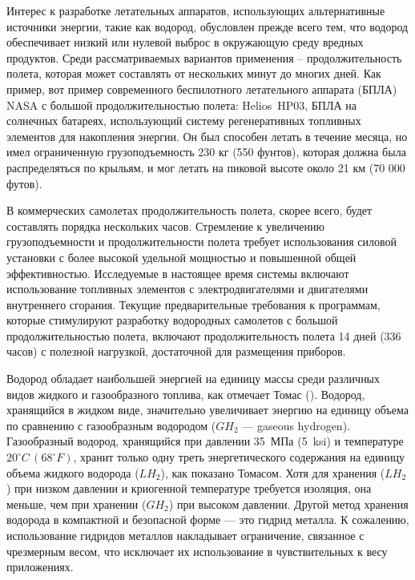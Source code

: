 Интерес к разработке летательных аппаратов, использующих альтернативные источники энергии, такие как водород, обусловлен прежде всего тем, что водород обеспечивает низкий или нулевой выброс в окружающую среду вредных продуктов. Среди рассматриваемых вариантов применения -- продолжительность полета, которая может составлять от нескольких минут до многих дней. Как пример, вот пример современного беспилотного летательного аппарата (БПЛА)  NASA с большой продолжительностью полета: Helios~HP03, БПЛА на солнечных батареях, использующий систему регенеративных топливных элементов для накопления энергии. Он был способен летать в течение месяца, но имел ограниченную грузоподъемность 230 кг (550 фунтов), которая должна была распределяться по крыльям, и мог летать на пиковой высоте около 21 км (70 000 футов).

В коммерческих самолетах продолжительность полета, скорее всего, будет составлять порядка нескольких часов. Стремление к увеличению грузоподъемности и продолжительности полета требует использования силовой установки с более высокой удельной мощностью и повышенной общей эффективностью. Исследуемые в настоящее время системы включают использование топливных элементов с электродвигателями и двигателями внутреннего сгорания. Текущие предварительные требования к программам, которые стимулируют разработку водородных самолетов с большой продолжительностью полета, включают продолжительность полета 14 дней (336 часов) с полезной нагрузкой, достаточной для размещения приборов.

Водород обладает наибольшей энергией на единицу массы среди различных видов жидкого и газообразного топлива, как отмечает Томас (\cite{thomas}). Водород, хранящийся в жидком виде, значительно увеличивает энергию на единицу объема по сравнению с газообразным водородом (\(GH_2\) --- gaseous hydrogen). Газообразный водород, хранящийся при давлении 35~МПа (5~ksi) и температуре \(20^{\circ} C \,(68^{\circ} F)\), хранит только одну треть энергетического содержания на единицу объема жидкого водорода (\(LH_2\)), как показано Томасом. Хотя для хранения (\(LH_2\)) при низком давлении и криогенной температуре требуется изоляция, она меньше, чем при хранении  (\(GH_2\)) при высоком давлении. Другой метод хранения водорода в компактной и безопасной форме --- это гидрид металла. К сожалению, использование гидридов металлов накладывает ограничение, связанное с чрезмерным весом, что исключает их использование в чувствительных к весу приложениях. 

